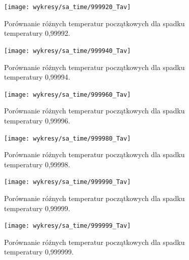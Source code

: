 \begin{figure}
\begin{center}
\texttt{[image: wykresy/sa\_time/999920\_Tav]}
\end{center}
\caption{Porównanie różnych temperatur początkowych dla spadku temperatury 0,99992.}
\label{999920_Tav}
\end{figure}

\begin{figure}
\begin{center}
\texttt{[image: wykresy/sa\_time/999940\_Tav]}
\end{center}
\caption{Porównanie różnych temperatur początkowych dla spadku temperatury 0,99994.}
\label{999940_Tav}
\end{figure}

\begin{figure}
\begin{center}
\texttt{[image: wykresy/sa\_time/999960\_Tav]}
\end{center}
\caption{Porównanie różnych temperatur początkowych dla spadku temperatury 0,99996.}
\label{999960_Tav}
\end{figure}

\begin{figure}
\begin{center}
\texttt{[image: wykresy/sa\_time/999980\_Tav]}
\end{center}
\caption{Porównanie różnych temperatur początkowych dla spadku temperatury 0,99998.}
\label{999980_Tav}
\end{figure}

\begin{figure}
\begin{center}
\texttt{[image: wykresy/sa\_time/999990\_Tav]}
\end{center}
\caption{Porównanie różnych temperatur początkowych dla spadku temperatury 0,99999.}
\label{999990_Tav}
\end{figure}

\begin{figure}
\begin{center}
\texttt{[image: wykresy/sa\_time/999999\_Tav]}
\end{center}
\caption{Porównanie różnych temperatur początkowych dla spadku temperatury 0,999999.}
\label{999999_Tav}
\end{figure}
